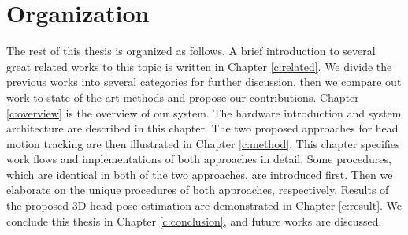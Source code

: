 
\section{Organization}
The rest of this thesis is organized as follows. A brief introduction to several great related works to this topic is written in Chapter \ref{c:related}. We divide the previous works into several categories for further discussion, then we compare out work to state-of-the-art methods and propose our contributions. Chapter \ref{c:overview} is the overview of our system. The hardware introduction and system architecture are described in this chapter. The two proposed approaches for head motion tracking are then illustrated in Chapter \ref{c:method}. This chapter specifies work flows and implementations of both approaches in detail. Some procedures, which are identical in both of the two approaches, are introduced first. Then we elaborate on the unique procedures of both approaches, respectively. Results of the proposed 3D head pose estimation are demonstrated in Chapter \ref{c:result}. We conclude this thesis in Chapter \ref{c:conclusion}, and future works are discussed.